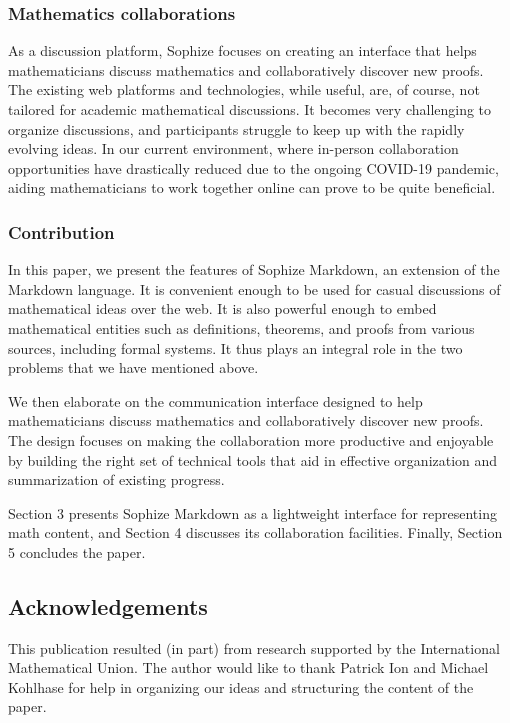 \documentclass[a4paper]{article}
\begin{document}
\subsubsection*{Mathematics collaborations}

As a discussion platform, Sophize focuses on creating an interface that helps mathematicians discuss mathematics and collaboratively discover new proofs. The existing web platforms and technologies, while useful, are, of course, not tailored for academic mathematical discussions. It becomes very challenging to organize discussions, and participants struggle to keep up with the rapidly evolving ideas. In our current environment, where in-person collaboration opportunities have drastically reduced due to the ongoing COVID-19 pandemic, aiding mathematicians to work together online can prove to be quite beneficial.


\subsubsection*{Contribution}

In this paper, we present the features of Sophize Markdown, an extension of the Markdown language. It is convenient enough to be used for casual discussions of mathematical ideas over the web. It is also powerful enough to embed mathematical entities such as definitions, theorems, and proofs from various sources, including formal systems. It thus plays an integral role in the two problems that we have mentioned above.

We then elaborate on the communication interface designed to help mathematicians discuss mathematics and collaboratively discover new proofs. The design focuses on making the collaboration more productive and enjoyable by building the right set of technical tools that aid in effective organization and summarization of existing progress.

Section 3 presents Sophize Markdown as a lightweight interface for representing math content, and Section 4 discusses its collaboration facilities. Finally, Section 5 concludes the paper.


\subsection*{Acknowledgements}
This publication resulted (in part) from research supported by the International Mathematical Union. The author would like to thank Patrick Ion and Michael Kohlhase for help in organizing our ideas and structuring the content of the paper.
\end{document}
